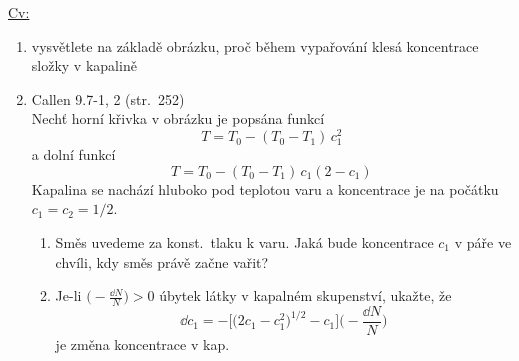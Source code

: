 \underline{Cv:}
\begin{enumerate}[label=\arabic*)]
  \item vysvětlete na základě obrázku, proč během vypařování klesá koncentrace složky  v kapalině
  \item Callen 9.7-1, 2 (str.\ 252) \\
  Nechť horní křivka v obrázku je popsána funkcí
  \[ T = T_0 - (T_0 - T_1)\,c_1^2 \]
  a dolní funkcí
  \[ T = T_0 - (T_0 - T_1)\,c_1(2 - c_1) \]
  Kapalina se nachází hluboko pod teplotou varu a koncentrace je na počátku $c_1 = c_2 = 1/2$.
  \begin{enumerate}[label=\alph*)]
    \item Směs uvedeme za konst.\ tlaku k varu. Jaká bude koncentrace $c_1$ v páře ve chvíli, kdy směs právě začne vařit?
    \item Je-li $\big(-\frac{\dd N}{N}\big) > 0$ úbytek látky v kapalném skupenství, ukažte, že
    \[ \dd c_1 = -\Big[\big(2c_1 - c_1^2\big)^{1/2} - c_1\Big]\Big(-\frac{\dd N}{N}\Big) \]
    je změna koncentrace  v kap.
\end{enumerate}
\end{enumerate}


